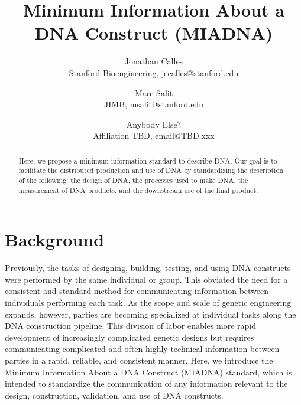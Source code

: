\documentclass[12pt,letterpaper,english]{article}
\title{Minimum Information About a DNA Construct (MIADNA)}
\author{Jonathan Calles \\ Stanford Bioengineering, jecalles@stanford.edu \and Marc Salit \\ JIMB, msalit@stanford.edu \\ \and Anybody Else? \\ Affiliation TBD, email@TBD.xxx}
\begin{document}
\maketitle
\begin{abstract}
Here, we propose a minimum information standard to describe DNA. Our goal is to facilitate the distributed production and use of DNA by standardizing the description of the following: the design of DNA, the processes used to make DNA, the measurement of DNA products, and the downstream use of the final product.
\end{abstract}

\tableofcontents

\section{Background}
Previously, the tasks of designing, building, testing, and using DNA constructs were performed by the same individual or group. This obviated the need for a consistent and standard method for communicating information between individuals performing each task. As the scope and scale of genetic engineering expands, however, parties are becoming specialized at individual tasks along the DNA construction pipeline. This division of labor enables more rapid development of increasingly complicated genetic designs but requires communicating complicated and often highly technical information between parties in a rapid, reliable, and consistent manner. Here, we introduce the Minimum Information About a DNA Construct (MIADNA) standard, which is intended to standardize the communication of any information relevant to the design, construction, validation, and use of DNA constructs.
\end{document}
